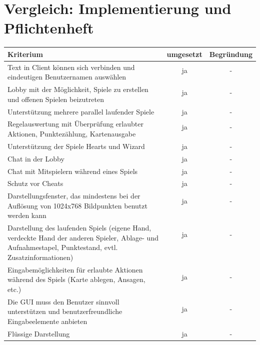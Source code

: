 \documentclass{article}
\begin{document}
\section{Vergleich: Implementierung und Pflichtenheft}
 \begin{tabular}{|l|c|c|}\hline
   Kriterium & umgesetzt & Begründung\\ \hline\hline
   \multirow{2}{80mm}{Text in Client können sich verbinden und eindeutigen Benutzernamen auswählen} & ja & - \\
   & & \\ \hline
   \multirow{2}{80mm}{Lobby mit der Möglichkeit, Spiele zu erstellen und offenen Spielen beizutreten} & ja & - \\ 
   & & \\ \hline
   Unterstützung mehrere parallel laufender Spiele & ja & - \\ \hline
   \multirow{2}{80mm}{Regelauswertung mit Überprüfung erlaubter Aktionen, Punktezählung, Kartenausgabe} & ja & - \\  & & \\  \hline
   Unterstützung der Spiele Hearts und Wizard & ja & - \\ \hline
   Chat in der Lobby & ja & - \\ \hline
   Chat mit Mitspielern während eines Spiels & ja & - \\ \hline
   Schutz vor Cheats & ja & - \\ \hline
   \multirow{3}{80mm}{Darstellungsfenster, das mindestens bei der Auflösung von 1024x768 Bildpunkten benutzt werden kann} & ja & - \\  & & \\ & & \\ \hline
   \multirow{4}{80mm}{Darstellung des laufenden Spiels (eigene Hand, verdeckte Hand der anderen Spieler, Ablage- und Aufnahmestapel, Punktestand, evtl. Zusatzinformationen)} & ja & - \\ & & \\  && \\ && \\\hline
   \multirow{2}{80mm}{Eingabemöglichkeiten für erlaubte Aktionen während des Spiels (Karte ablegen, Ansagen, etc.)} & ja & - \\ & & \\ \hline
   \multirow{2}{80mm}{Die GUI muss den Benutzer sinnvoll unterstützen und benutzerfreundliche Eingabeelemente anbieten} & ja & - \\ & & \\ \hline
   Flüssige Darstellung & ja & - \\ \hline

\end{tabular}
\end{document}
